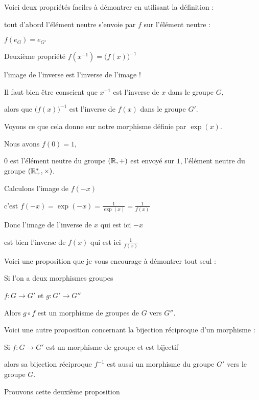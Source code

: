 Voici deux propriétés faciles à démontrer en utilisant la définition :

tout d'abord l'élément neutre s'envoie par $f$ sur l'élément neutre :

$f(e_G) = e_{G'}$

\change

Deuxième propriété $f(x^{-1}) = \big(f(x)\big)^{-1}$

l'image de l'inverse est l'inverse de l'image !

Il faut bien être conscient que $x^{-1}$ est l'inverse de
$x$ dans le groupe $G$, 

alors que $\big(f(x)\big)^{-1}$
est l'inverse de $f(x)$ dans le groupe $G'$.


\change

Voyons ce que cela donne sur notre morphisme définie par $\exp(x)$.

\change

Nous avons $f(0)=1$,

$0$ est l'élément neutre du groupe $(\mathbb{R},+)$
est envoyé sur $1$, l'élément neutre du groupe $(\mathbb{R}_+^*,\times)$.

\change

Calculons l'image de $f(-x)$

c'est $f(-x)=\exp(-x)= \frac{1}{\exp(x)}=\frac{1}{f(x)}$

Donc l'image de l'inverse de $x$ qui est ici $-x$

est bien l'inverse de $f(x)$ qui est ici $\frac{1}{f(x)}$

\diapo

Voici une proposition que je vous encourage à démontrer tout seul :

Si l'on a deux morphismes groupes 

$f : G \longrightarrow G'$ et $g : G'  \longrightarrow G''$

Alors $g \circ f $ est un morphisme de groupes de
 $G$ vers $G''$.

\change

Voici une autre proposition concernant la bijection réciproque
d'un morphisme :

Si $f : G \longrightarrow G'$ est un morphisme de groupe et est bijectif 

alors sa bijection réciproque  $f^{-1}$ est aussi un morphisme du groupe
$G'$ vers le groupe $G$.

\change

Prouvons cette deuxième proposition

